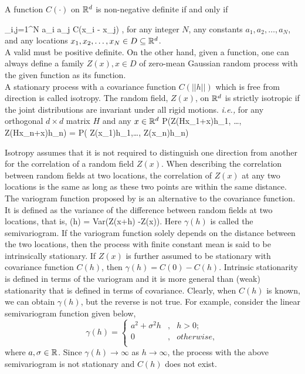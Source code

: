 A function $C(\cdot)$ on $\mathbb{R}^d$ is non-negative definite if and only if

\beq
\label{cov_pd}
\sum_{i,j=1}^{N} a_i a_j C(x_i - x_j) ,
\eeq
for any integer $N$, any constants $a_1, a_2, \ldots, a_N$, and any locations $x_1, x_2, \ldots, x_N \in D \subseteq \mathbb{R}^d$.\\ 

A valid \cov must be positive definite. On the other hand, given a \pd function, one can always define a family $Z(x), x \in D$ of zero-mean Gaussian random process with the given function as its \cov function.\\

A stationary process with a covariance function $C(||h||)$ which is free from direction is called isotropy. The random field, $Z(x)$, on $\mathbb{R}^d$ is strictly isotropic if the joint distributions are invariant under all rigid motions. {\em i.e.,} for any orthogonal $d\times d$ matrix $H$ and any $x\in \mathbb{R}^d$
\beq
P(Z(Hx_1+x)\le h_1, \ldots, Z(Hx_n+x)\le h_n) = P( Z(x_1)\le h_1,\ldots, Z(x_n)\le h_n)
\eeq

Isotropy assumes that it is not required to distinguish one direction from another for the correlation of a random field $Z(x)$. When describing the correlation between random fields at two locations, the correlation of $Z(x)$ at any two locations is the same as long as these two points are within the same distance.\\

The variogram function proposed by \cite{Matheron1973} is an alternative to the covariance function. It is defined as the variance of the difference between random fields at two locations, that is,
\gamma(h) = Var(Z(x+h) -Z(x)).
\eeq
Here $\gamma(h)$ is called the semivariogram. If the variogram function solely depends on the distance between the two locations, then the process with finite constant mean is said to be intrinsically stationary. If $Z(x)$ is further assumed to be stationary with covariance function $C(h)$, then $\gamma(h) = C(0) - C(h)$. Intrinsic stationarity is defined in terms of the variogram and it is more general than (weak) stationarity that is defined in terms of covariance. Clearly, when $C(h)$ is known, we can obtain $\gamma(h)$, but the reverse is not true. For example, consider the linear semivariogram function given below,
\[
	\gamma(h) = \left \{ \begin{array}{cll}
	a^2+\sigma^2h &, & h>0 ; \\
	0 &, & otherwise,  \\
	\end{array}
	\right.
\]
where $a,\sigma \in \mathbb{R}$. Since $\gamma(h) \to \infty$ as $h \to \infty$, the process with the above semivariogram is not stationary and $C(h)$ does not exist. \\

